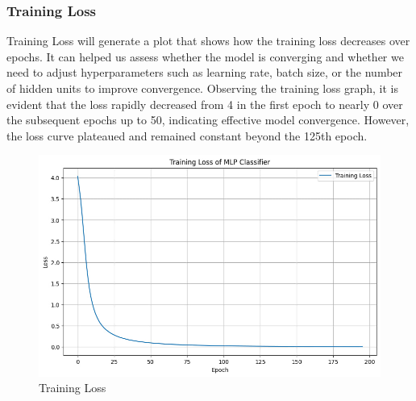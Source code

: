\subsubsection{Training Loss}
 Training Loss will generate a plot that shows how the training loss decreases over epochs. It can helped us assess whether the model is converging and whether we need to adjust hyperparameters such as learning rate, batch size, or the number of hidden units to improve convergence. Observing the training loss graph, it is evident that the loss rapidly decreased from 4 in the first epoch to nearly 0 over the subsequent epochs up to 50, indicating effective model convergence. However, the loss curve plateaued and remained constant beyond the 125th epoch.
\vspace{1cm}
\begin{figure}[H]
\centering
\includegraphics[width=0.7\linewidth]{img/Training Loss.jpg}
    \caption{ Training Loss}
    \label{fig:Traingin loss}
\end{figure}
\newpage

